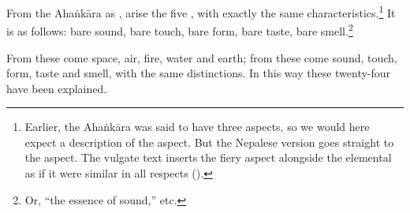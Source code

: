 \begin{translation}
            From the Ahaṅkāra as , arise the five ,
with exactly the same characteristics.\footnote{Earlier,
    the Ahaṅkāra was said to have three aspects, so we would
    here expect a description of the 
    aspect.  But the Nepalese version goes straight to the
     aspect.  The vulgate text inserts
    the fiery aspect alongside the elemental as if it were
    similar in all respects ().}  It is as
    follows: bare sound, bare touch, bare form, bare taste,
    bare smell.\footnote{Or, ``the essence of sound,'' etc.}
    
    From these  come space, air, fire, water and earth; 
    from these come sound, touch, form, taste and smell, with the same 
    distinctions.  In this way these twenty-four  have 
    been explained. 
            
    
\end{translation}
